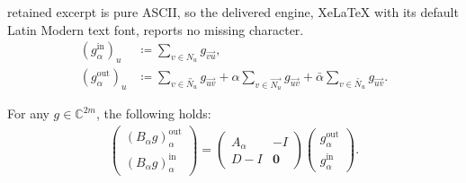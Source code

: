 \documentclass[10pt,a4paper]{amsart}
\begin{document}
retained excerpt is pure ASCII, so the delivered engine, XeLaTeX with its default Latin Modern text font, reports no missing character.
\begin{align}
	\left( g_{\alpha}^{\text{in}} \right)_{u}  & \coloneqq
	\sum_{v\in N_{u}} g_{\overrightarrow{vu}}
	,\label{definition:in-vector}                          \\
	\left( g_{\alpha}^{\text{out}} \right)_{u} & \coloneqq
	\sum_{v\in \overleftrightarrow{N_u}} g_{\overrightarrow{uv}}
	+ \alpha \sum_{v \in \overrightarrow{N_u}} g_{\overrightarrow{uv}}
	+ \bar{\alpha} \sum_{v \in \overleftarrow{N_u}} g_{\overrightarrow{uv}}
	.\label{definition:out-vector}
\end{align}

\begin{theorem}\label{theorem:edge-wise_to_node-wise}
	For any $g \in \mathbb{C}^{2m}$, the following holds:
	\begin{align}
		\begin{pmatrix}
			\left( B_{\alpha} g \right)_{\alpha}^{\text{out}}
			\\
			\left( B_{\alpha} g \right)_{\alpha}^{\text{in}}
		\end{pmatrix} =
		\begin{pmatrix}
			A_{\alpha} & -I
			\\
			D-I        & \bm{0}
		\end{pmatrix} \begin{pmatrix} g_{\alpha}^{\text{out}} \\ g_{\alpha}^{\text{in}} \end{pmatrix}
		.\label{eq:theorem:edge-wise_to_node-wise}
	\end{align}
\end{theorem}
\end{document}
